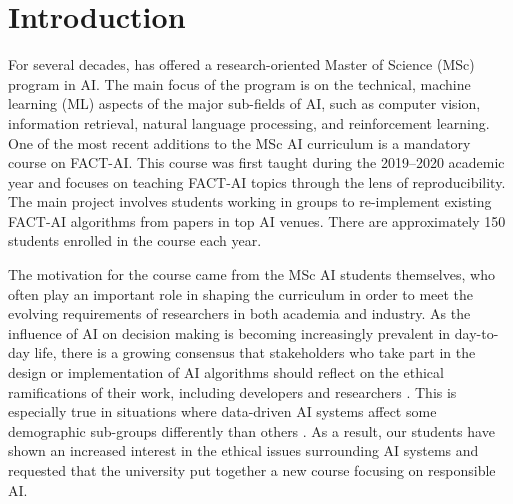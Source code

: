 
\section{Introduction}
\label{section:introduction}

For several decades, \OurUniversity{} has offered a research-oriented Master of Science (MSc) program in \acf{AI}. 
The main focus of the program is on the technical, machine learning (ML) aspects of the major sub-fields of \ac{AI}, such as computer vision, information retrieval, natural language processing, and reinforcement learning.
One of the most recent additions to the MSc AI curriculum is a mandatory course on \ac{FACT-AI}. 
This course was first taught during the 2019--2020 academic year and focuses on teaching FACT-AI topics through the lens of reproducibility. 
The main project involves students working in groups to re-implement existing FACT-AI algorithms from papers in top AI venues. 
There are approximately 150 students enrolled in the course each year. 

The motivation for the course came from the MSc AI students themselves, who often play an important role in shaping the curriculum in order to meet the evolving requirements of researchers in both academia and industry. 
As the influence of \ac{AI} on decision making is becoming increasingly prevalent in day-to-day life, there is a growing consensus that stakeholders who take part in the design or implementation of \ac{AI} algorithms should reflect on the ethical ramifications of their work, including developers and researchers \cite{campbell2021_responsible}. 
This is especially true in situations where data-driven AI systems affect some demographic sub-groups differently than others \cite{angwin2016machine, o2017ivory}.
As a result, our students have shown an increased interest in the ethical issues surrounding AI systems and requested that the university put together a new course focusing on responsible AI.

